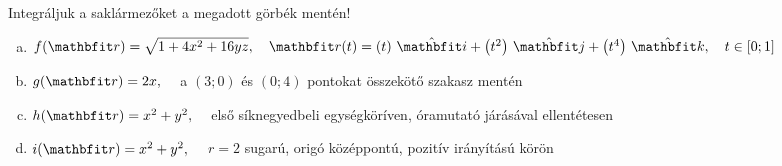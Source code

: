 \documentclass[exercise]{math-standalone}
\begin{document}
\begin{exercise}{Integráljuk a saklármezőket a megadott görbék mentén!}
  \begin{enumerate}[a)]
    \item $f(\rvec r) = \sqrt{1 + 4x^2 + 16yz}, \quad \rvec r(t) = \ijk{t}{t^2}{t^4}, \quad t \in [0; 1]$
    \item $g(\rvec r) = 2x, \quad$ a $(3;0)$ és $(0;4)$ pontokat összekötő szakasz mentén
    \item $h(\rvec r) = x^2 + y^2, \quad$ első síknegyedbeli egységköríven, óramutató járásával ellentétesen
    \item $i(\rvec r) = x^2 + y^2, \quad$ $r = 2$ sugarú, origó középpontú, pozitív irányítású körön
  \end{enumerate}

\end{exercise}
\end{document}
